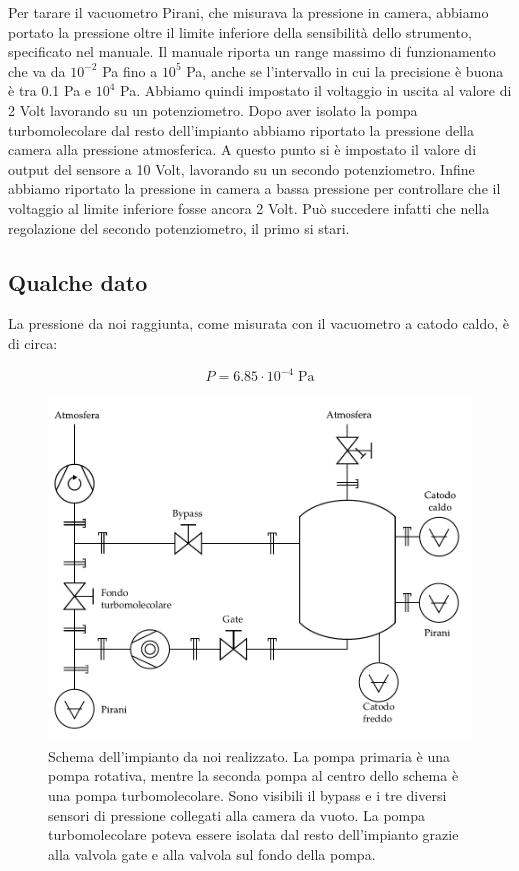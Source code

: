 Per tarare il vacuometro Pirani, che misurava la pressione in camera, abbiamo portato la pressione oltre il limite inferiore
della sensibilità dello strumento, specificato nel manuale. Il manuale riporta un range massimo di funzionamento che va da $10^{-2}$ \si{\pascal} fino a $10^5$ \si{\pascal}, anche se l'intervallo in cui la precisione è buona è tra 0.1 \si{\pascal} e $10^4$ \si{\pascal}. Abbiamo quindi impostato il voltaggio in uscita al valore di 2 Volt lavorando su un potenziometro. Dopo aver isolato la pompa turbomolecolare dal resto dell'impianto abbiamo riportato la pressione della camera alla pressione atmosferica. A questo punto si è impostato il valore di output del sensore a 10 Volt, lavorando su un secondo potenziometro. Infine abbiamo riportato la pressione in camera a bassa pressione per controllare che il voltaggio al limite inferiore fosse ancora 2 Volt. Può succedere infatti che nella regolazione del secondo potenziometro, il primo si stari.

\subsection{Qualche dato}

La pressione da noi raggiunta, come misurata con il vacuometro a catodo caldo, è di circa:

\begin{equation}
    P = 6.85 \cdot 10^{-4} \; \si{\pascal}
\end{equation}


\begin{figure}[b!]
    \centering
   \includegraphics[width=16cm]{drawing.pdf}
   \caption{Schema dell'impianto da noi realizzato. La pompa primaria è una pompa rotativa, mentre la seconda pompa al centro dello schema
   è una pompa turbomolecolare. Sono visibili il bypass e i tre diversi sensori di pressione collegati alla camera da vuoto. La pompa
   turbomolecolare poteva essere isolata dal resto dell'impianto grazie alla valvola gate e alla valvola sul fondo della pompa.}
   \label{fig:schema}
\end{figure}

